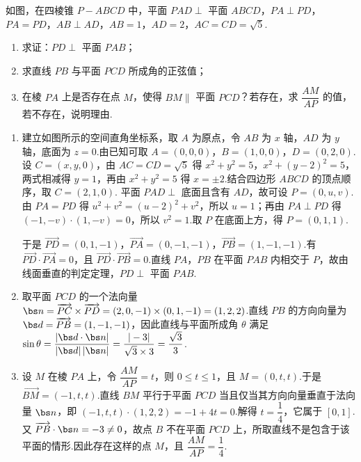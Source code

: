 \begin{problem}
如图，在四棱锥 \(P-ABCD\) 中，平面 \(PAD\perp\) 平面 \(ABCD\)，\(PA\perp PD\)，\(PA=PD\)，\(AB\perp AD\)，\(AB=1\)，\(AD=2\)，\(AC=CD=\sqrt5\).

\begin{enumerate}
\item 求证：\(PD\perp\) 平面 \(PAB\)；
\item 求直线 \(PB\) 与平面 \(PCD\) 所成角的正弦值；
\item 在棱 \(PA\) 上是否存在点 \(M\)，使得 \(BM\parallel\) 平面 \(PCD\)？若存在，求 \(\dfrac{AM}{AP}\) 的值，若不存在，说明理由.
\end{enumerate}

\end{problem}

\begin{solution}
\begin{enumerate}
\item 建立如图所示的空间直角坐标系，取 \(A\) 为原点，令 \(AB\) 为 \(x\) 轴，\(AD\) 为 \(y\) 轴，底面为 \(z=0\).由已知可取
\(A=(0,0,0)\)，\(B=(1,0,0)\)，\(D=(0,2,0)\).设 \(C=(x,y,0)\)，由 \(AC=CD=\sqrt5\) 得 \(x^2+y^2=5\)，\(x^2+(y-2)^2=5\)，两式相减得 \(y=1\)，再由 \(x^2+y^2=5\) 得 \(x=\pm2\).结合四边形 \(ABCD\) 的顶点顺序，取 \(C=(2,1,0)\).
平面 \(PAD\perp\) 底面且含有 \(AD\)，故可设 \(P=(0,u,v)\).由 \(PA=PD\) 得 \(u^2+v^2=(u-2)^2+v^2\)，所以 \(u=1\)；再由 \(PA\perp PD\) 得 \((-1,-v)\cdot(1,-v)=0\)，所以 \(v^2=1\).取 \(P\) 在底面上方，得 \(P=(0,1,1)\).

于是 \(\overrightarrow{PD}=(0,1,-1)\)，\(\overrightarrow{PA}=(0,-1,-1)\)，\(\overrightarrow{PB}=(1,-1,-1)\).有 \(\overrightarrow{PD}\cdot\overrightarrow{PA}=0\)，且 \(\overrightarrow{PD}\cdot\overrightarrow{PB}=0\).直线 \(PA\)，\(PB\) 在平面 \(PAB\) 内相交于 \(P\)，故由线面垂直的判定定理，\(PD\perp\) 平面 \(PAB\).
\item 取平面 \(PCD\) 的一个法向量
\(\bs n=\overrightarrow{PC}\times\overrightarrow{PD}=(2,0,-1)\times(0,1,-1)=(1,2,2)\).直线 \(PB\) 的方向向量为 \(\bs d=\overrightarrow{PB}=(1,-1,-1)\)，因此直线与平面所成角 \(\theta\) 满足
\(\sin\theta=\dfrac{|\bs d\cdot\bs n|}{|\bs d|\,|\bs n|}=\dfrac{|-3|}{\sqrt3\times3}=\dfrac{\sqrt3}{3}\).
\item 设 \(M\) 在棱 \(PA\) 上，令 \(\dfrac{AM}{AP}=t\)，则 \(0\le t\le1\)，且 \(M=(0,t,t)\).于是 \(\overrightarrow{BM}=(-1,t,t)\).直线 \(BM\) 平行于平面 \(PCD\) 当且仅当其方向向量垂直于法向量 \(\bs n\)，即
\((-1,t,t)\cdot(1,2,2)=-1+4t=0\).解得 \(t=\dfrac14\)，它属于 \([0,1]\).又 \(\overrightarrow{PB}\cdot\bs n=-3\ne0\)，故点 \(B\) 不在平面 \(PCD\) 上，所取直线不是包含于该平面的情形.因此存在这样的点 \(M\)，且 \(\dfrac{AM}{AP}=\dfrac14\).
\end{enumerate}
\end{solution}

